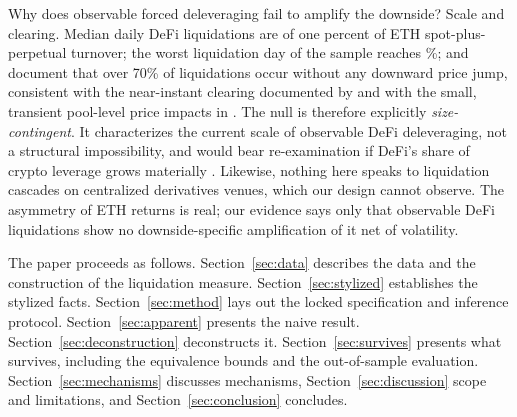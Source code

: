 Why does observable forced deleveraging fail to amplify the downside? Scale
and clearing. Median daily DeFi liquidations are \SizeMedianShare{} of one percent of ETH
spot-plus-perpetual turnover; the worst liquidation day of the sample reaches
\SizeShareWorstDay\%; and \citet{moallemi2024} document that over 70\% of
liquidations occur without any downward price jump, consistent with the
near-instant clearing documented by \citet{perez2021} and with the small,
transient pool-level price impacts in \citet{tian2025}. The null is therefore explicitly \emph{size-contingent}.
It characterizes the current scale of observable DeFi deleveraging, not a
structural impossibility, and would bear re-examination if DeFi's share of
crypto leverage grows materially \citep{fsb2023}. Likewise, nothing here
speaks to liquidation cascades on centralized derivatives venues, which our
design cannot observe. The asymmetry of ETH returns is real; our evidence
says only that observable DeFi liquidations show no downside-specific
amplification of it net of volatility.

The paper proceeds as follows. Section~\ref{sec:data} describes the data and
the construction of the liquidation measure. Section~\ref{sec:stylized}
establishes the stylized facts. Section~\ref{sec:method} lays out the locked
specification and inference protocol. Section~\ref{sec:apparent} presents the
naive result. Section~\ref{sec:deconstruction} deconstructs it.
Section~\ref{sec:survives} presents what survives, including the equivalence
bounds and the out-of-sample evaluation. Section~\ref{sec:mechanisms}
discusses mechanisms, Section~\ref{sec:discussion} scope and limitations, and
Section~\ref{sec:conclusion} concludes.
